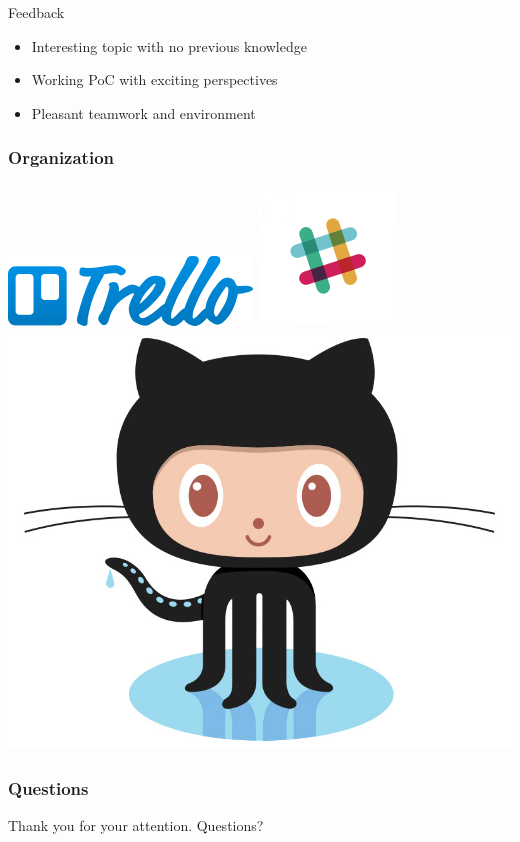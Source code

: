 
\begin{frame}{Feedback}
	\begin{itemize}
		\item Interesting topic with no previous knowledge
		\item Working PoC with exciting perspectives
		\item Pleasant teamwork and environment
	\end{itemize}
\end{frame}

\begin{frame}
	\frametitle{Organization}
	\begin{center}
		\includegraphics[scale=0.4]{figs/trello.png}
		\includegraphics[scale=0.4]{figs/slack.png}
		\includegraphics[scale=0.1]{figs/Octocat.jpg}
	\end{center}
\end{frame}




\begin{frame}
	\frametitle{Questions}
	\begin{center}
		Thank you for your attention. Questions?
	\end{center}
\end{frame}

